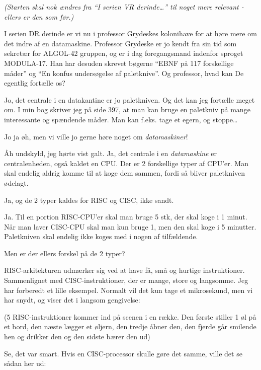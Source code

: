 \documentclass{article}
\begin{document}
{\sl\noindent(Starten skal nok ændres fra ``I serien VR
  derinde\ldots'' til noget mere relevant - ellers er den som
  før.)}
\begin{sketch}
 I serien DR derinde er vi nu i professor
Grydeskes kolonihave for at høre mere om det indre af en datamaskine.
Professor Grydeske er jo kendt fra sin tid som sekretær for ALGOL-42
gruppen, og er i dag foregangsmand indenfor sproget MODULA-17. Han har
desuden skrevet bøgerne ``EBNF på 117 forskellige måder'' og ``En
konfus undersøgelse af paletknive''. Og professor, hvad kan De
egentlig fortælle os?

 Jo, det centrale i en datakantine er jo
paletkniven. Og det kan jeg fortælle meget om. I min bog skriver jeg
på side 397, at man kan bruge en paletkniv på mange interessante og
spændende måder. Man kan f.eks. tage et egern, og stoppe\ldots

 Jo ja øh, men vi ville jo gerne høre noget om
{\em datamaskiner}!

 {\AA}h undskyld, jeg hørte vist galt. Ja, det
centrale i en {\em datamaskine} er centralenheden, også kaldet en
CPU. Der er 2 forskellige typer af CPU'er. Man skal endelig aldrig
komme til at koge dem sammen, fordi så bliver paletkniven ødelagt.

 Ja, og de 2 typer kaldes for RISC og CISC, ikke sandt.

 Ja. Til en portion RISC-CPU'er skal man bruge 5
stk, der skal koge i 1 minut. Når man laver CISC-CPU skal man kun
bruge 1, men den skal koge i 5 minutter. Paletkniven skal endelig ikke
koges med i nogen af tilfældende.

 Men er der ellers forskel på de 2 typer?

 RISC-arkitekturen udmærker sig ved at have få,
små og hurtige instruktioner. Sammenlignet med CISC-instruktioner,
der er mange, store og langsomme. Jeg har forberedt et lille eksempel.
Normalt vil det kun tage et mikrosekund, men vi har snydt, og viser
det i langsom gengivelse:


\scene (5 RISC-instruktioner kommer ind på scenen i en række. Den
første stiller 1 øl på et bord, den næste lægger et øljern, den
tredje åbner den, den fjerde går smilende hen og drikker den og den
sidste bærer den ud)

 Se, det var smart. Hvis en CISC-processor skulle gøre det
samme, ville det se sådan her ud:


\end{sketch}
\end{document}
